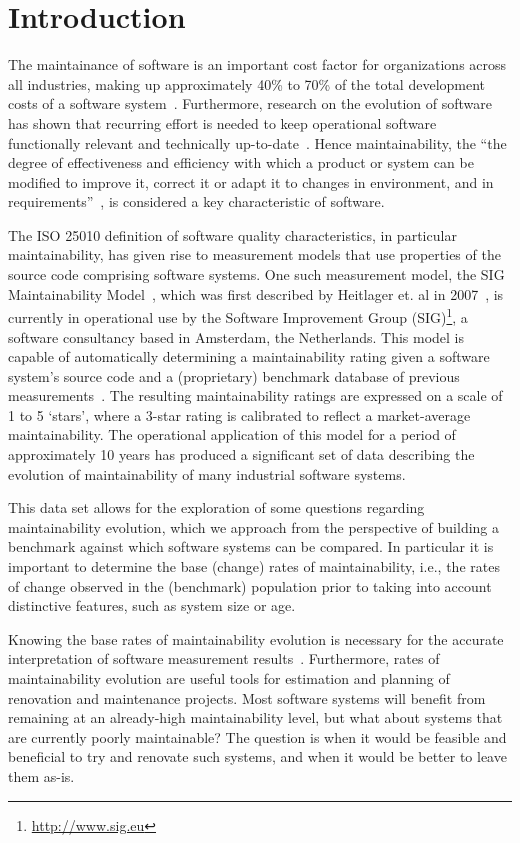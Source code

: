 \section{Introduction}
The maintainance of software is an important cost factor for organizations across all industries, making up approximately 40\% to 70\% of the total development costs of a software system~\cite{grubb2003software}.
Furthermore, research on the evolution of software has shown that recurring effort is needed to keep operational software functionally relevant and technically up-to-date~\cite{lehman1980programs}.  
Hence maintainability, the ``the degree of effectiveness and efficiency with which a product or system can be modified to improve it, correct it or adapt it to changes in environment, and in requirements''~\cite{iso25010}, is considered a key characteristic of software.

The {ISO 25010} definition of software quality characteristics, in particular maintainability, has given rise to measurement models that use properties of the source code comprising software systems.
One such measurement model, the SIG Maintainability Model~\cite{sig-maintainability-model}, which was first described by Heitlager et. al in 2007~\cite{heitlager2007practical}, is currently in operational use by the Software Improvement Group (SIG)\footnote{\url{http://www.sig.eu}}, a software consultancy based in Amsterdam, the Netherlands.
This model is capable of automatically determining a maintainability rating given a software system's source code and a (proprietary) benchmark database of previous measurements~\cite{alves2010deriving}.
The resulting maintainability ratings are expressed on a scale of 1 to 5 `stars', where a 3-star rating is calibrated to reflect a market-average maintainability.
The operational application of this model for a period of approximately 10 years has produced a significant set of data describing the evolution of maintainability of many industrial software systems.

This data set allows for the exploration of some questions regarding maintainability evolution, which we approach from the perspective of building a benchmark against which software systems can be compared.
In particular it is important to determine the base (change) rates of maintainability, i.e., the rates of change observed in the (benchmark) population prior to taking into account distinctive features, such as system size or age.

Knowing the base rates of maintainability evolution is necessary for the accurate interpretation of software measurement results~\cite{bruntink2015towards}.
Furthermore, rates of maintainability evolution are useful tools for estimation and planning of renovation and maintenance projects.
Most software systems will benefit from remaining at an already-high maintainability level, but what about systems that are currently poorly maintainable?
The question is when it would be feasible and beneficial to try and renovate such systems, and when it would be better to leave them as-is.

